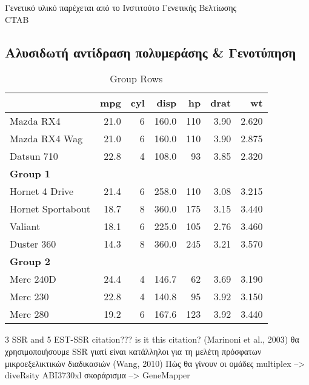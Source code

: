 \documentclass[12pt,a4paper,]{report}
\begin{document}
Γενετικό υλικό παρέχεται από το Ινστιτούτο Γενετικής Βελτίωσης\\
CTAB

\hypertarget{---}{%
\subsection{Αλυσιδωτή αντίδραση πολυμεράσης \& Γενοτύπηση}\label{---}}

\begin{table}

\caption{\label{tab:unnamed-chunk-1}Group Rows}
\centering
\begin{tabular}[t]{l r r r r r r}
\hline
  & mpg & cyl & disp & hp & drat & wt\\
\hline
Mazda RX4 & 21.0 & 6 & 160.0 & 110 & 3.90 & 2.620\\
Mazda RX4 Wag & 21.0 & 6 & 160.0 & 110 & 3.90 & 2.875\\
Datsun 710 & 22.8 & 4 & 108.0 & 93 & 3.85 & 2.320\\
\hline
\multicolumn{7}{l}{\textbf{Group 1}}\\
\hline
\hspace{1em}Hornet 4 Drive & 21.4 & 6 & 258.0 & 110 & 3.08 & 3.215\\
\hline
\hspace{1em}Hornet Sportabout & 18.7 & 8 & 360.0 & 175 & 3.15 & 3.440\\
\hline
\hspace{1em}Valiant & 18.1 & 6 & 225.0 & 105 & 2.76 & 3.460\\
\hline
\hspace{1em}Duster 360 & 14.3 & 8 & 360.0 & 245 & 3.21 & 3.570\\
\hline
\multicolumn{7}{l}{\textbf{Group 2}}\\
\hline
\hspace{1em}Merc 240D & 24.4 & 4 & 146.7 & 62 & 3.69 & 3.190\\
\hline
\hspace{1em}Merc 230 & 22.8 & 4 & 140.8 & 95 & 3.92 & 3.150\\
\hline
\hspace{1em}Merc 280 & 19.2 & 6 & 167.6 & 123 & 3.92 & 3.440\\
\hline
\end{tabular}
\end{table}

3 SSR and 5 EST-SSR citation??? is it this citation? (Marinoni et al.,
2003) θα χρησιμοποιήσουμε SSR γιατί είναι κατάλληλοι για τη μελέτη
πρόσφατων μικροεξελικτικών διαδικασιών (Wang, 2010) Πώς θα γίνουν οι
ομάδες multiplex --\textgreater{} diveRsity ABI3730xl σκοράρισμα
--\textgreater{} GeneMapper
\end{document}
